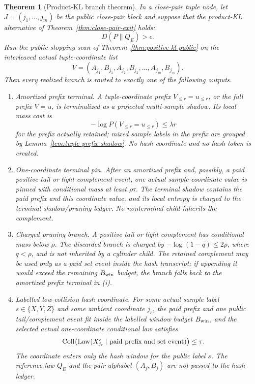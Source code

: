 \documentclass[11pt]{article}
\newtheorem{theorem}{Theorem}[section]
\newcommand{\Coll}{\operatorname{Coll}}
\newcommand{\Law}{\operatorname{Law}}
\begin{document}
\begin{theorem}[Product-KL branch theorem]
\label{thm:product-kl-branch}
\label{prop:product-kl-transfer}
In a close-pair tuple node, let $J=(j_1,\ldots,j_m)$ be the public close-pair
block and suppose that the product-KL alternative of
Theorem~\ref{thm:close-pair-exit} holds:
\[
  D(P\|Q_E)>\epsilon .
\]
Run the public stopping scan of Theorem~\ref{thm:positive-kl-public} on the
interleaved actual tuple-coordinate list
\[
  V=(A_{j_1},B_{j_1},A_{j_2},B_{j_2},\ldots,A_{j_m},B_{j_m}).
\]
Then every realized branch is routed to exactly one of the following outputs.
\begin{enumerate}[label=\textup{(\roman*)}]
\item \textup{Amortized prefix terminal.}  A tuple-coordinate prefix
$V_{\le r}=u_{\le r}$, or the full prefix $V=u$, is terminalized as a projected
multi-sample shadow.  Its local mass cost is
\[
  -\log P(V_{\le r}=u_{\le r})\le \lambda r
\]
for the prefix actually retained; mixed sample labels in the prefix are grouped
by Lemma~\ref{lem:tuple-prefix-shadow}.  No hash coordinate and no hash token is
created.
\item \textup{One-coordinate terminal pin.}  After an amortized prefix and,
possibly, a paid positive-tail or light-complement event, one actual
sample-coordinate value is pinned with conditional mass at least $\rho\tau$.
The terminal shadow contains the paid prefix and this coordinate value, and its
local entropy is charged to the terminal-shadow/pruning ledger.  No nonterminal
child inherits the complement.
\item \textup{Charged pruning branch.}  A positive tail or light complement has
conditional mass below $\rho$.  The discarded branch is charged by
$-\log(1-q)\le 2\rho$, where $q<\rho$, and is not inherited by a cylinder child.
The retained complement may be used only as a paid set event inside the hash
transcript; if appending it would exceed the remaining $B_{\rm win}$ budget, the
branch falls back to the amortized prefix terminal in \textup{(i)}.
\item \textup{Labelled low-collision hash coordinate.}  For some actual sample
label $s\in\{X,Y,Z\}$ and some ambient coordinate $j_r$, the paid prefix and one
public tail/complement event fit inside the labelled window budget
$B_{\rm win}$, and the selected actual one-coordinate conditional law satisfies
\[
  \Coll\bigl(\Law(X^s_{j_r}\mid \textup{paid prefix and set event})\bigr)
  \le \tau .
\]
The coordinate enters only the hash window for the public label $s$.  The
reference law $Q_E$ and the pair alphabet $(A_j,B_j)$ are not passed to the hash
ledger.
\end{enumerate}
\end{theorem}
\end{document}
